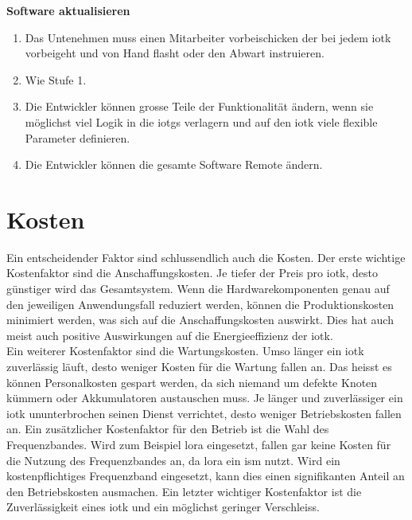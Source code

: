 \textbf{Software aktualisieren}
\begin{enumerate}  
  \item Das Untenehmen muss einen Mitarbeiter vorbeischicken der bei jedem \gls{iotk} vorbeigeht und von Hand flasht oder den Abwart instruieren.
  \item Wie Stufe 1.
  \item Die Entwickler können grosse Teile der Funktionalität ändern, wenn sie möglichst viel Logik in die \glspl{iotg} verlagern und auf den \gls{iotk} viele flexible Parameter definieren.
  \item Die Entwickler können die gesamte Software Remote ändern.
\end{enumerate}

\section{Kosten}

Ein entscheidender Faktor sind schlussendlich auch die Kosten. Der erste wichtige Kostenfaktor sind die Anschaffungskosten. Je tiefer der Preis pro \gls{iotk}, desto günstiger wird das Gesamtsystem. Wenn die Hardwarekomponenten genau auf den jeweiligen Anwendungsfall reduziert werden, können die Produktionskosten minimiert werden, was sich auf die Anschaffungskosten auswirkt. Dies hat auch meist auch positive Auswirkungen auf die Energieeffizienz der \gls{iotk}.\\
Ein weiterer Kostenfaktor sind die Wartungskosten. Umso länger ein \gls{iotk} zuverlässig läuft, desto weniger Kosten für die Wartung fallen an. Das heisst es können Personalkosten gespart werden, da sich niemand um defekte Knoten kümmern oder Akkumulatoren austauschen muss. Je länger und zuverlässiger ein \gls{iotk} ununterbrochen seinen Dienst verrichtet, desto weniger Betriebskosten fallen an. Ein zusätzlicher Kostenfaktor für den Betrieb ist die Wahl des Frequenzbandes. Wird zum Beispiel \gls{lora} eingesetzt, fallen gar keine Kosten für die Nutzung des Frequenzbandes an, da \gls{lora} ein \gls{ism} nutzt. Wird ein kostenpflichtiges Frequenzband eingesetzt, kann dies einen signifikanten Anteil an den Betriebskosten ausmachen. Ein letzter wichtiger Kostenfaktor ist die Zuverlässigkeit eines \gls{iotk} und ein möglichst geringer Verschleiss.
